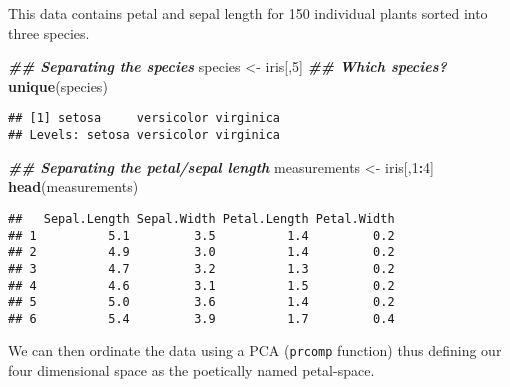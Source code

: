\documentclass[
]{book}
\newenvironment{Shaded}{\begin{snugshade}}{\end{snugshade}}
\newcommand{\DecValTok}[1]{\textcolor[rgb]{0.00,0.00,0.81}{#1}}
\newcommand{\DocumentationTok}[1]{\textcolor[rgb]{0.56,0.35,0.01}{\textbf{\textit{#1}}}}
\newcommand{\FunctionTok}[1]{\textcolor[rgb]{0.13,0.29,0.53}{\textbf{#1}}}
\newcommand{\NormalTok}[1]{#1}
\newcommand{\OtherTok}[1]{\textcolor[rgb]{0.56,0.35,0.01}{#1}}
\newcommand{\SpecialCharTok}[1]{\textcolor[rgb]{0.81,0.36,0.00}{\textbf{#1}}}
\begin{document}
This data contains petal and sepal length for 150 individual plants sorted into three species.

\begin{Shaded}
\begin{Highlighting}[]
\DocumentationTok{\#\# Separating the species}
\NormalTok{species }\OtherTok{\textless{}{-}}\NormalTok{ iris[,}\DecValTok{5}\NormalTok{]}
\DocumentationTok{\#\# Which species?}
\FunctionTok{unique}\NormalTok{(species)}
\end{Highlighting}
\end{Shaded}

\begin{verbatim}
## [1] setosa     versicolor virginica 
## Levels: setosa versicolor virginica
\end{verbatim}

\begin{Shaded}
\begin{Highlighting}[]
\DocumentationTok{\#\# Separating the petal/sepal length}
\NormalTok{measurements }\OtherTok{\textless{}{-}}\NormalTok{ iris[,}\DecValTok{1}\SpecialCharTok{:}\DecValTok{4}\NormalTok{]}
\FunctionTok{head}\NormalTok{(measurements)}
\end{Highlighting}
\end{Shaded}

\begin{verbatim}
##   Sepal.Length Sepal.Width Petal.Length Petal.Width
## 1          5.1         3.5          1.4         0.2
## 2          4.9         3.0          1.4         0.2
## 3          4.7         3.2          1.3         0.2
## 4          4.6         3.1          1.5         0.2
## 5          5.0         3.6          1.4         0.2
## 6          5.4         3.9          1.7         0.4
\end{verbatim}

We can then ordinate the data using a PCA (\texttt{prcomp} function) thus defining our four dimensional space as the poetically named petal-space.

\begin{Shaded}
\end{Shaded}
\end{document}
